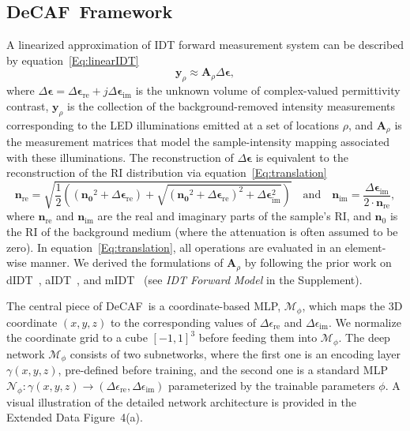 \documentclass[11pt]{article}
\theoremstyle{plain} %
\def\proposed{DeCAF}
\def\ybm{{\bm{y}}}
\def\Abm{{\bm{A}}}
\def\Mcal{{\mathcal{M}}}
\def\Ncal{{\mathcal{N}}}
\def\epsilonbm{\bm{\epsilon}}
\begin{document}
\subsection*{\proposed~Framework}
A linearized approximation of IDT forward measurement system can be described by equation~\eqref{Eq:linearIDT}
\begin{equation}
\label{Eq:linearIDT}
\ybm_\rho \approx \Abm_\rho \Delta \bm{\epsilon},
\end{equation}
where $\Delta \epsilonbm = \Delta \epsilonbm_\text{re} + j\Delta \epsilonbm_\text{im}$ is the unknown volume of complex-valued permittivity contrast, $\ybm_\rho$ is the collection of the background-removed intensity measurements corresponding to the LED illuminations emitted at a set of locations $\rho$, and $\Abm_\rho$ is the measurement matrices that model the sample-intensity mapping associated with these illuminations.
The reconstruction of $\Delta \epsilonbm$ is equivalent to the reconstruction of the RI distribution via equation~\eqref{Eq:translation}
\begin{equation} \label{Eq:translation}
\bm{n}_\text{re} = \sqrt{\frac{1}{2}((\bm{n_0}^2 + \Delta \epsilonbm_\text{re}) + \sqrt{(\bm{n_0}^2+\Delta \epsilonbm_\text{re})^2 + \Delta \epsilonbm_\text{im}^2})} \quad\text{and}\quad \bm{n}_\text{im} = \frac{\Delta \epsilonbm_\text{im}}{2\cdot \bm{n}_\text{re}},
\end{equation}
where $\bm{n}_\text{re}$ and $\bm{n}_\text{im}$ are the real and imaginary parts of the sample's RI, and $\bm{n}_0$ is the RI of the background medium (where the attenuation is often assumed to be zero). In equation~\eqref{Eq:translation}, all operations are evaluated in an element-wise manner. 
We derived the formulations of $\Abm_\rho$ by following the prior work on dIDT~\cite{Ling.etal18}, aIDT~\cite{LiJ.etal2019}, and mIDT~\cite{Matlock.etal2019} (see \emph{IDT Forward Model} in the Supplement).

The central piece of \proposed~is a coordinate-based MLP, $\Mcal_\phi$, which maps the 3D coordinate $(x,y,z)$ to the corresponding values of $\Delta \epsilon_\text{re}$ and $\Delta \epsilon_\text{im}$.
We normalize the coordinate grid to a cube $[-1,1]^3$ before feeding them into $\Mcal_\phi$.
The deep network $\Mcal_\phi$ consists of two subnetworks, where the first one is an encoding layer $\gamma(x,y,z)$, pre-defined before training, and the second one is a standard MLP $\Ncal_\phi:\gamma(x,y,z)\rightarrow (\Delta \epsilon_\text{re}, \Delta \epsilon_\text{im})$ parameterized by the trainable parameters $\phi$.  A visual illustration of the detailed network architecture is provided in the Extended Data Figure~4(a).
\end{document}
